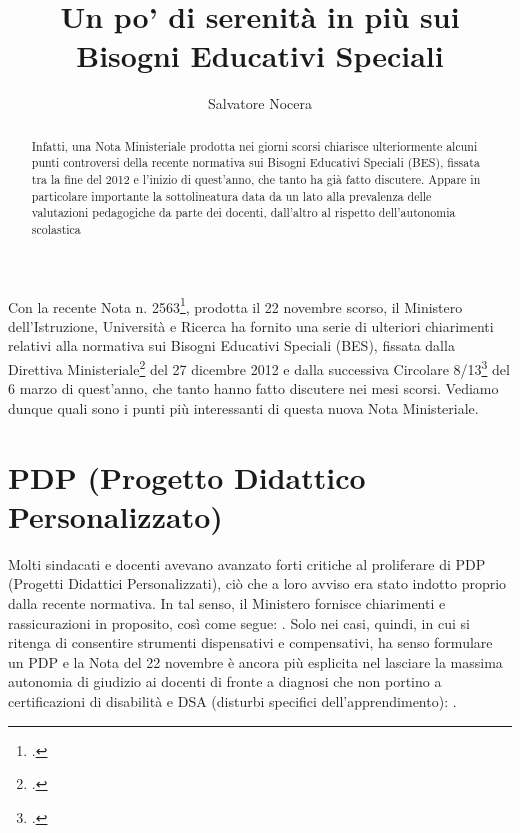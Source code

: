\author{Salvatore Nocera}
\title{Un po' di serenità in più sui Bisogni Educativi Speciali}
\label{cha:nocera261113}
\begin{abstract}
	Infatti, una Nota Ministeriale prodotta nei giorni scorsi chiarisce ulteriormente alcuni punti controversi della recente normativa sui Bisogni Educativi Speciali (BES), fissata tra la fine del 2012 e l'inizio di quest'anno, che tanto ha già fatto discutere. Appare in particolare importante la sottolineatura data da un lato alla prevalenza delle valutazioni pedagogiche da parte dei docenti, dall'altro al rispetto dell'autonomia scolastica
\end{abstract}
\maketitle
{}
Con la recente Nota n. 2563\footcite{Nota_2563_2013}, prodotta il 22 novembre scorso, il Ministero dell'Istruzione, Università e Ricerca ha fornito una serie di ulteriori chiarimenti relativi alla normativa sui Bisogni Educativi Speciali (BES), fissata dalla Direttiva Ministeriale\footcite{dir27Dic2012} del 27 dicembre 2012 e dalla successiva Circolare 8/13\footcite{cm8_2013} del 6 marzo di quest'anno, che tanto hanno fatto discutere nei mesi scorsi.
Vediamo dunque quali sono i  punti più interessanti di questa nuova Nota Ministeriale.
\section*{PDP (Progetto Didattico Personalizzato)}
Molti sindacati e docenti avevano avanzato forti critiche al proliferare di PDP (Progetti Didattici Personalizzati), ciò che a loro avviso era stato indotto proprio dalla recente normativa. In tal senso, il Ministero fornisce chiarimenti e rassicurazioni in proposito, così come segue:
.
Solo nei casi, quindi, in cui si ritenga di consentire strumenti dispensativi e compensativi, ha senso formulare un PDP e la Nota del 22 novembre è ancora più esplicita nel lasciare la massima autonomia di giudizio ai docenti di fronte a diagnosi che non portino a certificazioni di disabilità e DSA (disturbi specifici dell'apprendimento): .
